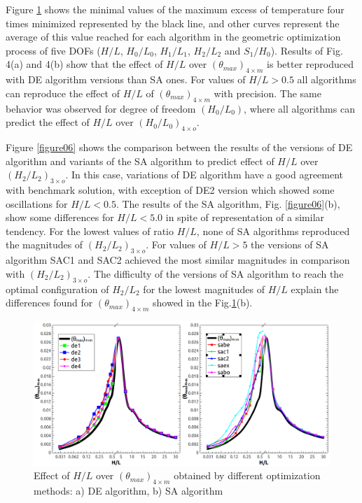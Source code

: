 \documentclass[12pt,fleqn]{article}
\begin{document}
Figure \ref{figure04} shows  the minimal values of the maximum excess of temperature four times minimized represented by the black line, and other curves represent the average of this value reached for each algorithm in the geometric optimization process of five DOFs ($H/L$, $H_{0}/L_{0}$, $H_{1}/L_{1}$, $H_{2}/L_{2}$ and $S_{1}/H_{0}$). Results of Fig. 4(a) and 4(b) show that the effect of $H/L$ over $({\theta}_{max})_{4\times m}$ is better reproduced with DE algorithm versions than SA ones. For values of $H/L > 0.5$ all algorithms can reproduce the effect of $H/L$ of $({\theta}_{max})_{4\times m}$ with precision. The same behavior was observed for degree of freedom $(H_{0}/L_{0})$, where all algorithms can predict the effect of $H/L$ over ${(H_{0}/L_{0})_{4\times o}}$.



Figure \ref{figure06} shows the comparison between the results of the versions of DE algorithm and variants of the SA algorithm to predict effect of $H/L$ over ${(H_{2}/L_{2})_{3\times o}}$. In this case, variations of DE algorithm have a good agreement with benchmark solution, with exception of DE2 version which showed some oscillations for $H/L< 0.5$. The results of the SA algorithm, Fig. \ref{figure06}(b), show some differences for $H/L < 5.0$ in spite of representation of a similar tendency. For the lowest values of ratio $H/L$, none of SA algorithms reproduced the magnitudes of ${(H_{2}/L_{2})_{3\times o}}$. For values of $H/L > 5$ the versions of SA algorithm SAC1 and SAC2 achieved the most similar magnitudes in comparison with ${(H_{2}/L_{2})_{3\times o}}$. The difficulty of the versions of SA algorithm to reach the optimal configuration of $H_{2}/L_{2}$ for the lowest magnitudes of $H/L$ explain the differences found for $({\theta}_{max})_{4\times m}$ showed in the Fig.\ref{figure04}(b).

\begin{figure}[H]
\centering
\includegraphics[width=1\linewidth]{imgs/5dof/de_sa_hl_tmin.png}
\caption{ {\small Effect of $H/L$ over $({\theta}_{max})_{4\times m}$ obtained by different optimization methods: a) DE algorithm, b) SA algorithm}}
\label{figure04}
\end{figure}
\end{document}

